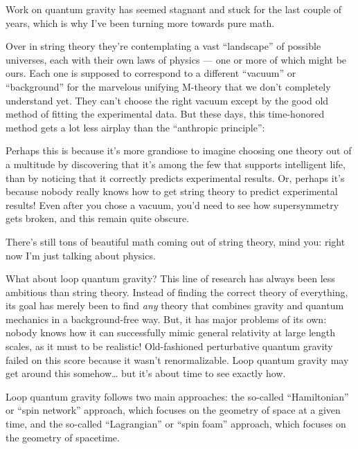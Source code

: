 \documentclass{article}
\def\tightlist{}
\renewcommand{\texttt}[1]{%
  \begingroup
  \ttfamily
  \begingroup\lccode`~=`/\lowercase{\endgroup\def~}{/\discretionary{}{}{}}%
  \begingroup\lccode`~=`[\lowercase{\endgroup\def~}{[\discretionary{}{}{}}%
  \begingroup\lccode`~=`.\lowercase{\endgroup\def~}{.\discretionary{}{}{}}%
  \catcode`/=\active\catcode`[=\active\catcode`.=\active
  \scantokens{#1\noexpand}%
  \endgroup
}
\begin{document}
Work on quantum gravity has seemed stagnant and stuck for the last
couple of years, which is why I've been turning more towards pure math.

Over in string theory they're contemplating a vast ``landscape'' of
possible universes, each with their own laws of physics --- one or more
of which might be ours. Each one is supposed to correspond to a
different ``vacuum'' or ``background'' for the marvelous unifying
M-theory that we don't completely understand yet. They can't choose the
right vacuum except by the good old method of fitting the experimental
data. But these days, this time-honored method gets a lot less airplay
than the ``anthropic principle'':


Perhaps this is because it's more grandiose to imagine choosing one
theory out of a multitude by discovering that it's among the few that
supports intelligent life, than by noticing that it correctly predicts
experimental results. Or, perhaps it's because nobody really knows how
to get string theory to predict experimental results! Even after you
chose a vacuum, you'd need to see how supersymmetry gets broken, and
this remain quite obscure.

There's still tons of beautiful math coming out of string theory, mind
you: right now I'm just talking about physics.

What about loop quantum gravity? This line of research has always been
less ambitious than string theory. Instead of finding the correct theory
of everything, its goal has merely been to find \emph{any} theory that
combines gravity and quantum mechanics in a background-free way. But, it
has major problems of its own: nobody knows how it can successfully
mimic general relativity at large length scales, as it must to be
realistic! Old-fashioned perturbative quantum gravity failed on this
score because it wasn't renormalizable. Loop quantum gravity may get
around this somehow\ldots{} but it's about time to see exactly how.

Loop quantum gravity follows two main approaches: the so-called
``Hamiltonian'' or ``spin network'' approach, which focuses on the
geometry of space at a given time, and the so-called ``Lagrangian'' or
``spin foam'' approach, which focuses on the geometry of spacetime.
\end{document}
